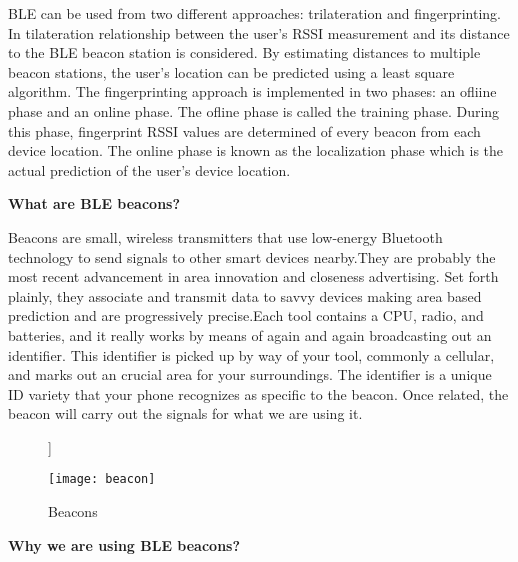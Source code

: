 BLE can be used from two different approaches: trilateration and fingerprinting. In tilateration relationship between the user's RSSI measurement and its distance to the BLE beacon station is considered. By estimating distances to multiple beacon stations, the user's location can be predicted using a least square algorithm. The  fingerprinting approach is implemented in two phases: an ofliine phase and an online phase. The ofline phase is called the training phase. During this phase, fingerprint  RSSI values are determined of every beacon from each device location. The online phase is known as the localization phase which is the actual prediction of the user's device location.

\textbf{What are BLE beacons?}

Beacons are small, wireless transmitters that use low-energy Bluetooth technology to send signals to other smart devices nearby.They are probably the most recent advancement in area innovation and closeness advertising. Set forth plainly, they associate and transmit data to savvy devices making area based prediction and are progressively precise.Each tool contains a CPU, radio, and batteries, and it really works by means of again and again broadcasting out an identifier. This identifier is picked up by way of your tool, commonly a cellular, and marks out an crucial area for your surroundings. The identifier is a unique ID variety that your phone recognizes as specific to the beacon. Once related, the beacon will carry out the signals for what we are using it. 
\begin{figure}[h]]
\begin{center}
\texttt{[image: beacon]}
\caption{Beacons}
\label{fig:1}
\end{center}
\end{figure}


\textbf{Why we are using BLE beacons?}

